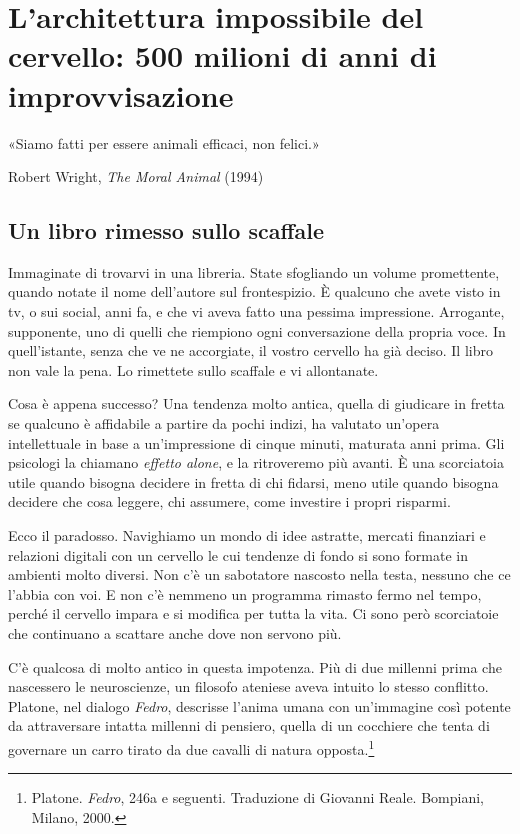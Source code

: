 \chapter{L'architettura impossibile del cervello: 500 milioni di anni di improvvisazione}
\label{cap:p1c1}

\epigraph{«Siamo fatti per essere animali efficaci, non felici.»}{Robert Wright, \textit{The Moral Animal} (1994)}

\section{Un libro rimesso sullo scaffale}

Immaginate di trovarvi in una libreria. State sfogliando un volume promettente, quando notate il nome dell'autore sul frontespizio. È qualcuno che avete visto in tv, o sui social, anni fa, e che vi aveva fatto una pessima impressione. Arrogante, supponente, uno di quelli che riempiono ogni conversazione della propria voce. In quell'istante, senza che ve ne accorgiate, il vostro cervello ha già deciso. Il libro non vale la pena. Lo rimettete sullo scaffale e vi allontanate.

Cosa è appena successo? Una tendenza molto antica, quella di giudicare in fretta se qualcuno è affidabile a partire da pochi indizi, ha valutato un'opera intellettuale in base a un'impressione di cinque minuti, maturata anni prima. Gli psicologi la chiamano \textit{effetto alone}, e la ritroveremo più avanti. È una scorciatoia utile quando bisogna decidere in fretta di chi fidarsi, meno utile quando bisogna decidere che cosa leggere, chi assumere, come investire i propri risparmi.

Ecco il paradosso. Navighiamo un mondo di idee astratte, mercati finanziari e relazioni digitali con un cervello le cui tendenze di fondo si sono formate in ambienti molto diversi. Non c'è un sabotatore nascosto nella testa, nessuno che ce l'abbia con voi. E non c'è nemmeno un programma rimasto fermo nel tempo, perché il cervello impara e si modifica per tutta la vita. Ci sono però scorciatoie che continuano a scattare anche dove non servono più.

C'è qualcosa di molto antico in questa impotenza. Più di due millenni prima che nascessero le neuroscienze, un filosofo ateniese aveva intuito lo stesso conflitto. Platone, nel dialogo \textit{Fedro}, descrisse l'anima umana con un'immagine così potente da attraversare intatta millenni di pensiero, quella di un cocchiere che tenta di governare un carro tirato da due cavalli di natura opposta.\footnote{Platone. \textit{Fedro}, 246a e seguenti. Traduzione di Giovanni Reale. Bompiani, Milano, 2000.}


